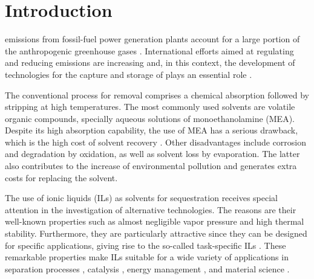 \documentclass[3p,twocolumn]{elsarticle}
\begin{document}

\section{Introduction}
\label{sec:intro}

 emissions from fossil-fuel power generation plants account for a large portion of the anthropogenic greenhouse gases \cite{totalenergy}.
International efforts aimed at regulating and reducing  emissions are increasing \cite{Tong_2018} and, in this context, the development of technologies for the capture and storage of  plays an essential role \cite{Markewitz_2014}.

The conventional process for  removal comprises a chemical absorption followed by stripping at high temperatures.
The most commonly used solvents are volatile organic compounds, specially aqueous solutions of monoethanolamine (MEA).
Despite its high absorption capability, the use of MEA has a serious drawback, which is the high cost of solvent recovery \cite{Merkel_2010}.
Other disadvantages include corrosion and degradation by oxidation, as well as solvent loss by evaporation.
The latter also contributes to the increase of environmental pollution and generates extra costs for replacing the solvent.

The use of ionic liquids (ILs) as solvents for  sequestration receives special attention in the investigation of alternative technologies.
The reasons are their well-known properties such as almost negligible vapor pressure and high thermal stability.
Furthermore, they are particularly attractive since they can be designed for specific applications, giving rise to the so-called task-specific ILs \cite{Seo_2014}.
These remarkable properties make ILs suitable for a wide variety of applications in separation processes \cite{Han_2010,Werner_2010}, catalysis \cite{P_rvulescu_2007}, energy management \cite{MacFarlane_2014}, and material science \cite{Mecerreyes_2011,Tom_2015,Dupont_2010,Leones_2017,Kinik_2017}.
\end{document}
